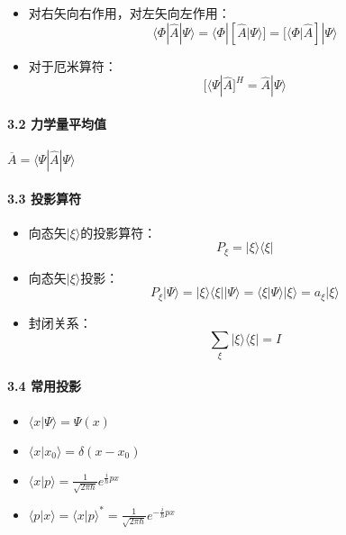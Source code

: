 \documentclass[UTF8,twocolumn]{ctexart}
\providecommand{\tightlist}{%
  \setlength{\itemsep}{0pt}\setlength{\parskip}{0pt}}
\let\oldparagraph\paragraph
\renewcommand{\paragraph}[1]{\oldparagraph{#1}\mbox{}}
\begin{document}
\begin{itemize}
\tightlist
\item
  对右矢向右作用，对左矢向左作用：
  \[\langle\Phi|\hat{A}|\Psi\rangle=\langle\Phi|[\hat{A}|\Psi\rangle]=[\langle\Phi|\hat{A}]|\Psi\rangle\]
\item
  对于厄米算符：
  \[[\langle\Psi|\hat{A}]^H=\hat{A}|\Psi\rangle\]
\end{itemize}

\hypertarget{ux529bux5b66ux91cfux5e73ux5747ux503c}{%
\paragraph{ 3.2
力学量平均值}\label{ux529bux5b66ux91cfux5e73ux5747ux503c}}

\begin{center}
  \(\overline{A}=\langle\Psi|\hat{A}|\Psi\rangle\)
\end{center}

\hypertarget{ux6295ux5f71ux7b97ux7b26}{%
\paragraph{ 3.3 投影算符}\label{ux6295ux5f71ux7b97ux7b26}}

\begin{itemize}
\tightlist
\item
  向态矢\(|\xi\rangle\)的投影算符： \[P_{\xi}=|\xi\rangle\langle\xi|\]
\item
  向态矢\(|\xi\rangle\)投影：
  \[P_{\xi}|\Psi\rangle=|\xi\rangle\langle\xi||\Psi\rangle=\langle\xi|\Psi\rangle|\xi\rangle=a_{\xi}|\xi\rangle\]
\item
  封闭关系： \[\sum_{\xi}|\xi\rangle\langle\xi|=I\]
\end{itemize}

\hypertarget{ux5e38ux7528ux6295ux5f71}{%
\paragraph{ 3.4 常用投影}\label{ux5e38ux7528ux6295ux5f71}}

\begin{itemize}
\tightlist
\item
  \(\langle x|\Psi\rangle=\Psi(x)\)
\item
  \(\langle x|x_0\rangle=\delta(x-x_0)\)
\item
  \(\langle x|p\rangle=\frac{1}{\sqrt{2\pi\hbar}}e^{\frac{i}{\hbar}px}\)
\item
  \(\langle p|x\rangle=\langle x|p\rangle^*=\frac{1}{\sqrt{2\pi\hbar}}e^{-\frac{i}{\hbar}px}\)
\end{itemize}
\end{document}
